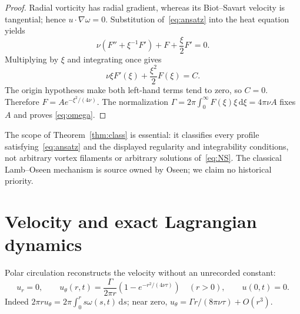 \documentclass[10pt]{article}
\newcommand{\dd}{\,\mathrm d}
\begin{document}
\begin{proof}
Radial vorticity has radial gradient, whereas its Biot--Savart velocity is
tangential; hence $u\cdot\nabla\omega=0$.  Substitution of~\eqref{eq:ansatz}
into the heat equation yields
\begin{equation}\label{eq:ode}
 \nu(F''+\xi^{-1}F')+F+\frac{\xi}{2}F'=0.
\end{equation}
Multiplying by $\xi$ and integrating once gives
\begin{equation}\label{eq:first}
 \nu\xi F'(\xi)+\frac{\xi^2}{2}F(\xi)=C.
\end{equation}
The origin hypotheses make both left-hand terms tend to zero, so $C=0$.
Therefore $F=Ae^{-\xi^2/(4\nu)}$.  The normalization
$\Gamma=2\pi\int_0^\infty F(\xi)\xi\dd\xi=4\pi\nu A$ fixes $A$ and proves
\eqref{eq:omega}.
\end{proof}

The scope of Theorem~\ref{thm:class} is essential: it classifies every
profile satisfying~\eqref{eq:ansatz} and the displayed regularity and
integrability conditions, not arbitrary vortex filaments or arbitrary
solutions of~\eqref{eq:NS}.  The classical Lamb--Oseen mechanism is source
owned by Oseen; we claim no historical priority.

\section{Velocity and exact Lagrangian dynamics}
Polar circulation reconstructs the velocity without an unrecorded constant:
\begin{equation}\label{eq:velocity}
 u_r=0,\qquad
 u_\theta(r,t)=\frac{\Gamma}{2\pi r}
 \left(1-e^{-r^2/(4\nu\tau)}\right)\quad(r>0),
 \qquad u(0,t)=0.
\end{equation}
Indeed $2\pi r u_\theta=2\pi\int_0^r s\omega(s,t)\dd s$; near zero,
$u_\theta=\Gamma r/(8\pi\nu\tau)+O(r^3)$.
\end{document}
